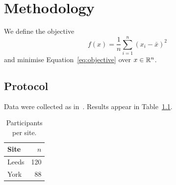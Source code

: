 \chapter{Methodology}\label{sec:method}
We define the objective
\begin{equation}
  f(x) = \frac{1}{n}\sum_{i=1}^{n} (x_i - \bar{x})^2 \label{eq:objective}
\end{equation}
and minimise Equation~\eqref{eq:objective} over $x \in \mathbb{R}^n$.

\section{Protocol}\label{sec:protocol}
Data were collected as in~\cite{lee2020}. Results appear in Table~\ref{tab:sites}.

\begin{table}[h]
  \centering
  \caption{Participants per site.}\label{tab:sites}
  \begin{tabular}{lr}
    Site & $n$ \\
    \hline
    Leeds & 120 \\
    York & 88 \\
  \end{tabular}
\end{table}
